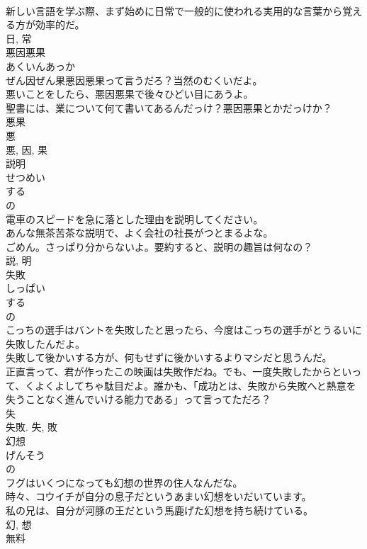 \documentclass[8pt]{extreport}
\begin{document}
\begin{CJK}{UTF8}{min}
\\	新しい言語を学ぶ際、まず始めに日常で一般的に使われる実用的な言葉から覚える方が効率的だ。	
\\	日, 常	
\\	悪因悪果	
\\	あくいんあっか	
\\	ぜん因ぜん果悪因悪果って言うだろ？当然のむくいだよ。	
\\	悪いことをしたら、悪因悪果で後々ひどい目にあうよ。	
\\	聖書には、業について何て書いてあるんだっけ？悪因悪果とかだっけか？	
\\	悪果 
\\	悪 
\\	悪, 因, 果	
\\	説明	
\\	せつめい	
\\	する 
\\	の 
\\	電車のスピードを急に落とした理由を説明してください。	
\\	あんな無茶苦茶な説明で、よく会社の社長がつとまるよな。	
\\	ごめん。さっぱり分からないよ。要約すると、説明の趣旨は何なの？	
\\	説, 明	
\\	失敗	
\\	しっぱい	
\\	する 
\\	の 
\\	こっちの選手はバントを失敗したと思ったら、今度はこっちの選手がとうるいに失敗したんだよ。	
\\	失敗して後かいする方が、何もせずに後かいするよりマシだと思うんだ。	
\\	正直言って、君が作ったこの映画は失敗作だね。でも、一度失敗したからといって、くよくよしてちゃ駄目だよ。誰かも、「成功とは、失敗から失敗へと熱意を失うことなく進んでいける能力である」って言ってただろ？	
\\	失 
\\	失敗.	失, 敗	
\\	幻想	
\\	げんそう	
\\	の 
\\	フグはいくつになっても幻想の世界の住人なんだな。	
\\	時々、コウイチが自分の息子だというあまい幻想をいだいています。	
\\	私の兄は、自分が河豚の王だという馬鹿げた幻想を持ち続けている。	
\\	幻, 想	
\\	無料	

\end{CJK}
\end{document}
